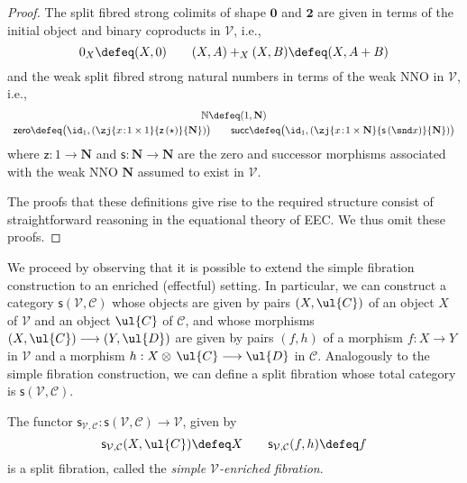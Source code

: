 \begin{proof}
The split fibred strong colimits of shape $\mathbf{0}$ and $\mathbf{2}$ are given in terms of the initial object and binary coproducts in $\mathcal{V}$, i.e., 
\[
0_X \defeq (X , 0) 
\qquad
(X,A) +_X (X,B) \defeq (X, A + B)
\]
and the weak split fibred strong natural numbers in terms of the weak NNO in $\mathcal{V}$, i.e., 
\[
\begin{array}{c}
\mathbb{N} \defeq (1, \mathbf{N})
\\[1mm]
\mathsf{zero} \defeq \big(\id_1 , (\zj {x \!:\! 1 \times 1} {\mathsf{z}\, (\star)} {\mathbf{N}})\big)
\qquad
\mathsf{succ} \defeq \big(\id_1, (\zj {x \!:\! 1 \times \mathbf{N}} {\mathsf{s}\, (\snd x)} {\mathbf{N}})\big)
\end{array}
\]
where $\mathsf{z} : 1 \longrightarrow \mathbf{N}$ and $\mathsf{s} : \mathbf{N} \longrightarrow \mathbf{N}$ are the zero and successor morphisms associated with the weak NNO $\mathbf{N}$ assumed to exist in $\mathcal{V}$.

The proofs that these definitions give rise to the required structure consist of straightforward reasoning in the equational theory of EEC\raisebox{0.75pt}{+}. We thus omit these proofs.
\end{proof}

We proceed by observing that it is possible to extend the simple fibration construction to an enriched (effectful) setting. In particular, we can construct a category $\mathsf{s}(\!\mathcal{V},\mathcal{C})$ whose objects are given by pairs $(X,\ul{C})$ of an object $X$ of $\mathcal{V}$ and an object $\ul{C}$ of $\mathcal{C}$, and whose morphisms $(X,\ul{C}) \longrightarrow (Y,\ul{D})$ are given by pairs $(f,h)$ of a morphism $f : X \longrightarrow Y$ in $\mathcal{V}$ and a morphism $h : X \otimes\, \ul{C} \longrightarrow \ul{D}$ in $\mathcal{C}$. 
Analogously to the simple fibration construction, we can define a split fibration whose total category is $\mathsf{s}(\!\mathcal{V},\mathcal{C})$.

\begin{proposition}
The functor $\mathsf{s}_{\mathcal{V}, \mathcal{C}} : \mathsf{s}(\!\mathcal{V},\mathcal{C}) \longrightarrow \mathcal{V}$, given by
\[
\mathsf{s}_{\mathcal{V},\mathcal{C}}(X,\ul{C}) \defeq X
\qquad
\mathsf{s}_{\mathcal{V},\mathcal{C}}(f,h) \defeq f
\]
is a split fibration, called the \emph{simple $\mathcal{V}$-enriched fibration}.
\end{proposition}

